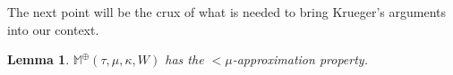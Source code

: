 \documentclass[a4paper]{amsart}
\theoremstyle{definition}
\theoremstyle{remark}
\theoremstyle{plain}
\newtheorem{mylem}[mydef]{Lemma}
\numberwithin{mydef}{section}
\DeclareMathOperator{\dom}{dom}
\newcommand{\dM}{\mathbb{M}}
\newcommand{\uhr}{\upharpoonright}
\begin{document}
%	
%		
%		
%		
%		
	
The next point will be the crux of what is needed to bring Krueger's arguments into our context.
	
			\begin{mylem}\label{ApproxProp}
$\dM^{\oplus}(\tau,\mu,\kappa,W)$ has the $<\mu$-approximation property.\end{mylem}
\end{document}
